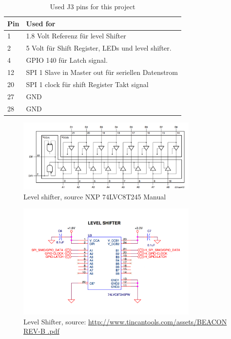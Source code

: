\begin{table}[h]
\centering
\begin{tabular}{| l |  p{7cm} |}
\hline
\textbf{Pin} & \textbf{Used for} \\ \hline
1 & 1.8 Volt Referenz für level Shifter \\ \hline
2 & 5 Volt für Shift Register, LEDs und level shifter. \\ \hline
4 & GPIO 140 für Latch signal. \\ \hline
12 & SPI 1 Slave in Master out  für seriellen Datenstrom \\ \hline
20 & SPI 1 clock für shift Register Takt signal \\ \hline
27 & GND \\ \hline
28 & GND \\
\hline
\end{tabular}
\caption{Used J3 pins for this project}
\label{tab:pinUsageTable}
\end{table}


\begin{figure}[H]
   \centering
   \includegraphics[width=0.8\textwidth]{img/level_Shifter.png}%
   \caption{Level shifter, source NXP  74LVC8T245 Manual}
   \label{fig:level_Shifter}%
\end{figure}

\begin{figure}[H]
   \centering
   \includegraphics[width=0.8\textwidth]{img/Levelshifter.png}%
   \caption{Level Shifter, source: \url{http://www.tincantools.com/assets/BEACON REV-B .pdf}}
   \label{fig:levelShifter2}%
\end{figure}